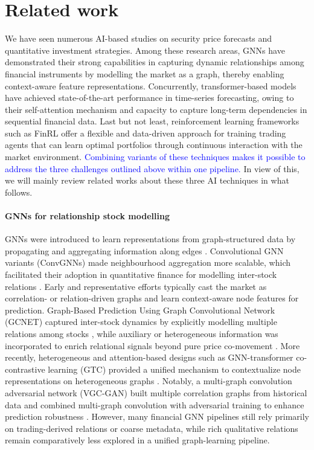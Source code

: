 \documentclass[pdflatex,sn-mathphys-num]{sn-jnl}%
\theoremstyle{thmstyleone}%
\theoremstyle{thmstyletwo}%
\theoremstyle{thmstylethree}%
\begin{document}
\section{Related work}\label{sec2}

We have seen numerous AI-based studies on security price forecasts and quantitative investment strategies. Among these research areas, GNNs have demonstrated their strong capabilities in capturing dynamic relationships among financial instruments by modelling the market as a graph, thereby enabling context-aware feature representations. Concurrently, transformer-based models have achieved state-of-the-art performance in time-series forecasting, owing to their self-attention mechanism and capacity to capture long-term dependencies in sequential financial data. Last but not least, reinforcement learning frameworks such as FinRL \citep{Liu2021FinRL} offer a flexible and data-driven approach for training trading agents that can learn optimal portfolios through continuous interaction with the market environment. \textcolor{blue}{Combining variants of these techniques makes it possible to address the three challenges outlined above within one pipeline.} In view of this, we will mainly review related works about these three AI techniques in what follows.

\paragraph{GNNs for relationship stock modelling}
GNNs were introduced to learn representations from graph-structured data by propagating and aggregating information along edges \citep{Scarselli2009GNNModel}. 
Convolutional GNN variants (ConvGNNs) made neighbourhood aggregation more scalable, which facilitated their adoption in quantitative finance for modelling inter-stock relations \citep{Chen2018CIKMStockGCN}.
Early and representative efforts typically cast the market as correlation- or relation-driven graphs and learn context-aware node features for prediction. 
Graph-Based Prediction Using Graph Convolutional Network (GCNET) captured inter-stock dynamics by explicitly modelling multiple relations among stocks \citep{Jafari2022GCNET}, while auxiliary or heterogeneous information was incorporated to enrich relational signals beyond pure price co-movement \citep{Andrea2023AdaptiveFiltersGCNN}. 
More recently, heterogeneous and attention-based designs such as GNN-transformer co-contrastive learning (GTC) provided a unified mechanism to contextualize node representations on heterogeneous graphs \citep{Sun2025GTC}. 
Notably, a multi-graph convolution adversarial network (VGC-GAN) built multiple correlation graphs from historical data and combined multi-graph convolution with adversarial training to enhance prediction robustness \citep{Ma2024VGC_GAN}.
However, many financial GNN pipelines still rely primarily on trading-derived relations or coarse metadata, while rich qualitative relations remain comparatively less explored in a unified graph-learning pipeline.
\end{document}
